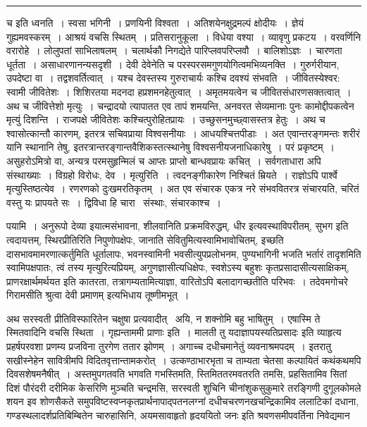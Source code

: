 \documentclass[11pt, openany]{book}
\begin{document}
\vspace{2mm}
\hrule

\noindent
{\s च इति ध्वनति~। स्वसा भगिनी~। प्रणयिनी विश्वता~। अतिशयेनक्षुद्रमल्पं क्षोदीयः~। {\qt ज्ञेयं गुह्यमवस्करम्}~। आश्रयं वचसि स्थितम्~। प्रतिसरानुकूला~। विधेया वश्या~। व्यावृणु प्रकटय~। वरवर्णिनि वरारोहे~। लोलुपतां साभिलाषलम्~। {\qt चलार्थकौ निगद्येते पारिप्लवपरिप्लवौ}~। बालिशोऽज्ञः~। चारणता धूर्तता~। असाधारणानन्यसदृशी~। देवी देवेनेति च परस्परसमगुणयोगित्वमभिव्यनक्ति~। गुरुर्गरीयान, उपदेष्टा वा~। तद्वशवर्तित्वात्~। यश्च देवस्तस्य गुरुराचार्यः कश्चि दवश्यं संभवति~। जीवितस्येश्वर: स्वामी जीवितेशः~। शिशिरतया मदनदा हप्रशमनहेतुत्वात्~। अमृतमयत्वेन च जीवितसंधारणसक्तत्वात्~। अथ च जीवित्तेशो मृत्युः~। चन्द्रादयो त्यापातत एव तापं शमयन्ति, अनवरत सेव्यमानाः पुनः कामोद्दीपकत्वेन मृत्युं दिशन्ति~। राजपक्षे जीवितेशः कश्चित्पुरोहितप्रायः~। उच्छुसनमुच्छ्वासस्तत्र हेतुः~। अथ च श्वासोत्कान्तौ कारणम्, इतरत्र सचिवप्राया विश्वसनीयाः~। आधयश्चित्तपीडाः~। अत एवान्तरङ्गमन्तः शरीरं यानि स्थानानि तेषु, इतरत्रान्तरङ्गान्तवैशिकस्तत्स्थानेषु विश्वसनीयजनाधिकारेषु~। परं प्रकृष्टम्~। असुहरोऽमित्रो वा, अन्यत्र परमसुहृन्मिलं च आप्तः प्राप्तो बान्धवप्रायः कचित्~। सर्वगताधारा अपि संस्थाख्याः~। विग्रहो विरोधः, देव~। {\qtt मृत्युरिति}~। त्वदनङ्गीकारेण निश्चितं म्रियते~। राज्ञोऽपि पार्श्वे मृत्युस्तिष्ठत्येव~। रणरणको दुःखमरतिकृतम्~। अत एव संचारक एकत्र नरे संभववितरत्र संचारयति, चरितं वस्तु यः प्रापयते सः~। द्विविधा हि चारा \textendash\ संस्थाः, संचारकाश्च~।}

\newpage

\noindent
पयामि~। अनुरूपो देव्या इयात्मसंभावना, शीलवानिति प्रक्रमविरुद्धम्, धीर इत्यवस्थाविपरीतम्, सुभग इति त्वदायत्तम्, स्थिरप्रीतिरिति निपुणोपक्षेपः, जानाति सेवितुमित्यस्वामिभावोचितम्, इच्छति दासभावमामरणात्कर्तुमिति धूर्तालापः, भवनस्वामिनी भवसीत्युपप्रलोभनम, पुण्यभागिनी भजति भर्तारं तादृशमिति स्वामिपक्षपातः, त्वं तस्य मृत्युरित्यप्रियम्, अगुणज्ञासीत्यधिक्षेपः, स्वशेऽस्य बहुशः कृतप्रसादासीत्यसाक्षिकम्, प्राणरक्षार्थमर्थयत इति कातरता, तत्रागम्यतामित्याज्ञा, वारितोऽपि बलादागच्छतीति परिभवः~। तदेवमगोचरे गिरामसीति श्रुत्वा देवी प्रमाणम् इत्यभिधाय तूष्णीमभूत्~।

अथ सरस्वती प्रीतिविस्फारितेन चक्षुषा प्रत्यवादीत् \textendash\ {\haq अयि, न शक्नोमि बहु भाषितुम्~। एषास्मि ते स्मितवादिनि वचसि स्थिता~। गृह्यन्ताममी प्राणाः} इति~। मालती तु {\haq यदाज्ञापयस्यतिप्रसादः} इति व्याहृत्य प्रहर्षपरवशा प्रणम्य प्रजविना तुरगेण ततार झोणम्~। अगाच्च दधीचमानेतुं व्यवनाश्रमपदम्~। इतरातु सखीस्नेहेन सावित्रीमपि विदितवृत्तान्तामकरोत्~। उत्कण्ठाभारभृता च ताम्यता चेतसा कल्पायितं कथंकथमपि दिवसशेषमनैषीत्~। अस्तमुपगतवति भगवति गभस्तिमति, स्तिमिततरमवतरति तमसि, प्रहसितामिव सितां दिशं पौरंदरी दरीमिक केसरिणि मुञ्चति चन्द्रमसि, सरस्वती शुचिनि चीनांशुकसुकुमारे तरङ्गिणी दुगूलकोमले शयन इव शोणसैकते समुपविष्टस्वप्नकृतप्रार्थनापाद्पतनलग्नां दधीचचरणनखचन्द्रिकामिव ललाटिकां दधाना, गण्डस्थलादर्शप्रतिबिम्बितेन {\haq चारुहासिनि, अयमसावाहृतो हृदययितो जनः} इति श्रवणसमीपवर्तिना निवेद्यमान\textendash
\end{document}
